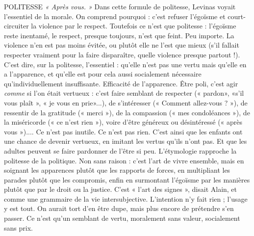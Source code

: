 POLITESSE  {\it « Après vous. »} Dans cette formule de politesse, Levinas voyait
l'essentiel de la morale. On comprend pourquoi : c’est refuser
l’égoïsme et court-circuiter la violence par le respect. Toutefois ce n’est que
politesse : l’égoïsme reste inentamé, le respect, presque toujours, n’est que feint.
Peu importe. La violence n’en est pas moins évitée, ou plutôt elle ne l’est que
mieux (s’il fallait respecter vraiment pour la faire disparaître, quelle violence
presque partout !). C’est dire, sur la politesse, l'essentiel : qu’elle n’est pas une
vertu mais qu’elle en a l’apparence, et qu’elle est pour cela aussi socialement
nécessaire qu'individuellement insuffisante. Efficacité de l'apparence. Être poli,
c’est agir {\it comme} si l'on était vertueux : c’est faire semblant de respecter (« pardon»,
«s’il vous plaît », « je vous en prie»...), de s’intéresser (« Comment
allez-vous ? »), de ressentir de la gratitude (« merci »), de la compassion (« mes
condoléances »), de la miséricorde (« ce n’est rien »), voire d’être généreux ou
désintéressé (« après vous »).... Ce n’est pas inutile. Ce n’est pas rien. C’est ainsi
que les enfants ont une chance de devenir vertueux, en imitant les vertus qu’ils
n’ont pas. Et que les adultes peuvent se faire pardonner de l'être si peu.
L’étymologie rapproche la politesse de la politique. Non sans raison : c’est
l’art de vivre ensemble, mais en soignant les apparences plutôt que les rapports
de forces, en multipliant les parades plutôt que les compromis, enfin en surmontant
l’égoïsme par les manières plutôt que par le droit ou la justice. C'est
« l’art des signes », disait Alain, et comme une grammaire de la vie intersubjective.
L'intention n’y fait rien ; l’usage y est tout. On aurait tort d’en être dupe,
mais plus encore de prétendre s’en passer. Ce n’est qu’un semblant de vertu,
moralement sans valeur, socialement sans prix.

